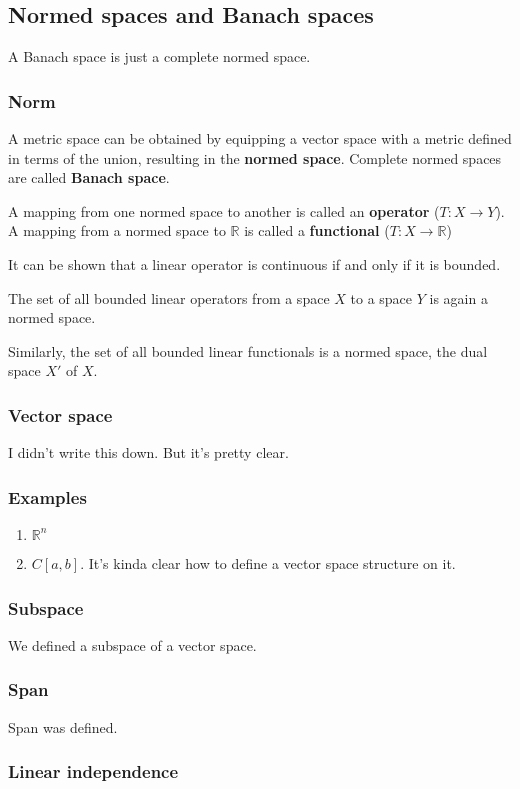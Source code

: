 \documentclass[11pt]{article}
\def\R{\mathbb{R}}
\begin{document}
\subsection{Normed spaces and Banach spaces}
\label{sec:org5889c32}
A Banach space is just a complete normed space.
\subsubsection{Norm}
\label{sec:org16bc5d0}
A metric space can be obtained by equipping a vector space with a metric
defined in terms of the union, resulting in the \textbf{normed space}. Complete
normed spaces are called \textbf{Banach space}.

A mapping from one normed space to another is called an \textbf{operator} (\(T\colon
    X \rightarrow Y\)). A mapping from a normed space to \(\R\) is called a
\textbf{functional} (\(T\colon X \rightarrow \R\))

It can be shown that a linear operator is continuous if and only if it is
bounded.

The set of all bounded linear operators from a space \(X\) to a space \(Y\) is
again a normed space.

Similarly, the set of all bounded linear functionals is a normed space, the
dual space \(X'\) of \(X\).
\subsubsection{Vector space}
\label{sec:org28ccb26}
I didn't write this down. But it's pretty clear. 
\subsubsection{Examples}
\label{sec:org9f384f2}
\begin{enumerate}
\item \(\R^n\)
\item \(C[a, b]\). It's kinda clear how to define a vector space structure on it.
\end{enumerate}
\subsubsection{Subspace}
\label{sec:org0664b2e}
We defined a subspace of a vector space. 
\subsubsection{Span}
\label{sec:org7c76928}
Span was defined.
\subsubsection{Linear independence}
\label{sec:org8ffb0c7}
\end{document}

